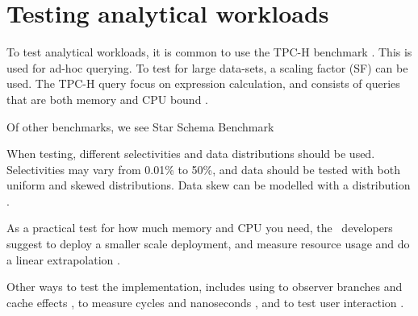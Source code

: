 \section{Testing analytical workloads}
\label{sec:Testing analytical workloads}
To test analytical workloads, it is common to use the TPC-H benchmark \cite{Boncz2002-yj}. This is used for ad-hoc querying. To test for large data-sets, a scaling factor (SF) can be used. The TPC-H query focus on expression calculation, and consists of queries that are both memory and CPU bound \cite{Boncz2005-wj}.

Of other benchmarks, we see Star Schema Benchmark \cite{Boncz2002-yj}

When testing, different selectivities and data distributions should be used. Selectivities may vary from 0.01\% to 50\%, and data should be tested with both uniform and skewed distributions. Data skew can be modelled with a  distribution \cite{Holloway2008-rr}.

As a practical test for how much memory and CPU you need, the \qlikview~developers suggest to deploy a smaller scale deployment, and measure resource usage and do a linear extrapolation \cite{Qlik2011-yc}.

Other ways to test the implementation, includes using  to observer branches and cache effects \cite{Neumann2011-uq},  to measure cycles and nanoseconds \cite{Willhalm2013-ri}, and  to test user interaction \cite{Qlik2012-ku}.


